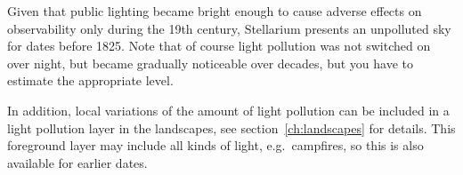 Given that public lighting became bright enough to cause adverse effects on
observability only during the 19th century, Stellarium presents an unpolluted
sky for dates before 1825.
Note that of course light pollution was not switched on over night, 
but became gradually noticeable over decades, but you have to estimate the appropriate level. 

In addition, local variations of
the amount of light pollution can be included in a light pollution
layer in the landscapes, see
section~\ref{ch:landscapes} for details. This foreground layer may include 
all kinds of light, e.g.\  campfires, so this is also available for earlier 
dates.


